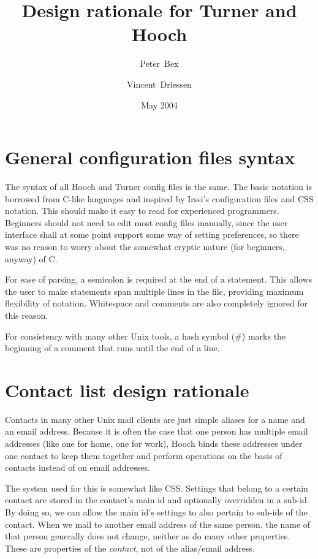 \documentclass[a4paper]{article}
\title{Design rationale for Turner and Hooch}
\date{May 2004}
\author{Peter~Bex\and{}Vincent~Driessen}
\begin{document}
\maketitle

\section{General configuration files syntax}

The syntax of all Hooch and Turner config files is the same.
The basic notation is borrowed from C-like languages and inspired by
Irssi's configuration files and CSS notation.  This should make it easy
to read for experienced programmers.  Beginners should not need to edit
most config files manually, since the user interface shall at some point
support some way of setting preferences, so there was no reason to worry
about the somewhat cryptic nature (for beginners, anyway) of C.

For ease of parsing, a semicolon is required at the end of a statement.
This allows the user to make statements span multiple lines in the file,
providing maximum flexibility of notation.  Whitespace and comments are
also completely ignored for this reason.

For consistency with many other Unix tools, a hash symbol (\#) marks the
beginning of a comment that runs until the end of a line.


\section{Contact list design rationale}

Contacts in many other Unix mail clients are just simple aliases for a
name and an email address.  Because it is often the case that one
person has multiple email addresses (like one for home, one for work),
Hooch binds these addresses under one contact to keep them together and
perform operations on the basis of contacts instead of on email
addresses.

The system used for this is somewhat like CSS.  Settings that belong to a
certain contact are stored in the contact's main id and optionally
overridden in a sub-id.  By doing so, we can allow the main id's settings
to also pertain to sub-ids of the contact.  When we mail to another email
address of the same person, the name of that person generally does not
change, neither as do many other properties.  These are properties of
the \emph{contact}, not of the alias/email address.
\end{document}

